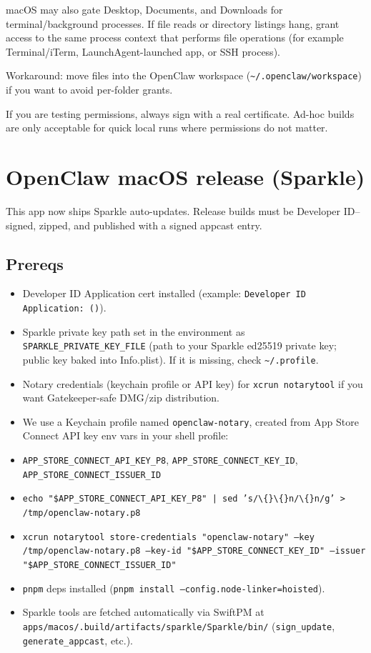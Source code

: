 macOS may also gate Desktop, Documents, and Downloads for terminal/background processes. If file reads or directory listings hang, grant access to the same process context that performs file operations (for example Terminal/iTerm, LaunchAgent-launched app, or SSH process).

Workaround: move files into the OpenClaw workspace (\texttt{\textasciitilde{}/.openclaw/workspace}) if you want to avoid per-folder grants.

If you are testing permissions, always sign with a real certificate. Ad-hoc
builds are only acceptable for quick local runs where permissions do not matter.


\clearpage

\section{OpenClaw macOS release (Sparkle)}


This app now ships Sparkle auto-updates. Release builds must be Developer ID–signed, zipped, and published with a signed appcast entry.

\subsection{Prereqs}


\begin{itemize}
  \item Developer ID Application cert installed (example: \texttt{Developer ID Application:  ()}).
  \item Sparkle private key path set in the environment as \texttt{SPARKLE\_PRIVATE\_KEY\_FILE} (path to your Sparkle ed25519 private key; public key baked into Info.plist). If it is missing, check \texttt{\textasciitilde{}/.profile}.
  \item Notary credentials (keychain profile or API key) for \texttt{xcrun notarytool} if you want Gatekeeper-safe DMG/zip distribution.
  \item We use a Keychain profile named \texttt{openclaw-notary}, created from App Store Connect API key env vars in your shell profile:
  \item \texttt{APP\_STORE\_CONNECT\_API\_KEY\_P8}, \texttt{APP\_STORE\_CONNECT\_KEY\_ID}, \texttt{APP\_STORE\_CONNECT\_ISSUER\_ID}
  \item \texttt{echo "\$APP\_STORE\_CONNECT\_API\_KEY\_P8" | sed 's/\textbackslash\{\}\textbackslash\{\}n/\textbackslash\{\}n/g' > /tmp/openclaw-notary.p8}
  \item \texttt{xcrun notarytool store-credentials "openclaw-notary" --key /tmp/openclaw-notary.p8 --key-id "\$APP\_STORE\_CONNECT\_KEY\_ID" --issuer "\$APP\_STORE\_CONNECT\_ISSUER\_ID"}
  \item \texttt{pnpm} deps installed (\texttt{pnpm install --config.node-linker=hoisted}).
  \item Sparkle tools are fetched automatically via SwiftPM at \texttt{apps/macos/.build/artifacts/sparkle/Sparkle/bin/} (\texttt{sign\_update}, \texttt{generate\_appcast}, etc.).
\end{itemize}


